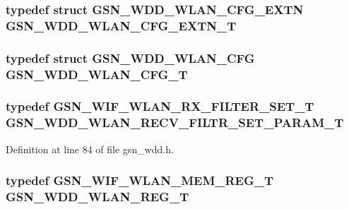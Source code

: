\hypertarget{a00603_ab591a0b1dc86f93d62c54f486296eed4}{
\subsubsection[{GSN\_\-WDD\_\-WLAN\_\-CFG\_\-EXTN\_\-T}]{\setlength{\rightskip}{0pt plus 5cm}typedef struct {\bf GSN\_\-WDD\_\-WLAN\_\-CFG\_\-EXTN} {\bf GSN\_\-WDD\_\-WLAN\_\-CFG\_\-EXTN\_\-T}}}
\label{a00603_ab591a0b1dc86f93d62c54f486296eed4}
\hypertarget{a00603_a622f424d99b2a980a82684099bb1092c}{
\subsubsection[{GSN\_\-WDD\_\-WLAN\_\-CFG\_\-T}]{\setlength{\rightskip}{0pt plus 5cm}typedef struct {\bf GSN\_\-WDD\_\-WLAN\_\-CFG}  {\bf GSN\_\-WDD\_\-WLAN\_\-CFG\_\-T}}}
\label{a00603_a622f424d99b2a980a82684099bb1092c}
\hypertarget{a00603_ad07f561fb358b50268072fff65afce3d}{
\subsubsection[{GSN\_\-WDD\_\-WLAN\_\-RECV\_\-FILTR\_\-SET\_\-PARAM\_\-T}]{\setlength{\rightskip}{0pt plus 5cm}typedef {\bf GSN\_\-WIF\_\-WLAN\_\-RX\_\-FILTER\_\-SET\_\-T} {\bf GSN\_\-WDD\_\-WLAN\_\-RECV\_\-FILTR\_\-SET\_\-PARAM\_\-T}}}
\label{a00603_ad07f561fb358b50268072fff65afce3d}


Definition at line 84 of file gsn\_\-wdd.h.

\hypertarget{a00603_a398cf6ae18e42fbe90a94ba03ef55230}{
\subsubsection[{GSN\_\-WDD\_\-WLAN\_\-REG\_\-T}]{\setlength{\rightskip}{0pt plus 5cm}typedef {\bf GSN\_\-WIF\_\-WLAN\_\-MEM\_\-REG\_\-T} {\bf GSN\_\-WDD\_\-WLAN\_\-REG\_\-T}}}
\label{a00603_a398cf6ae18e42fbe90a94ba03ef55230}


